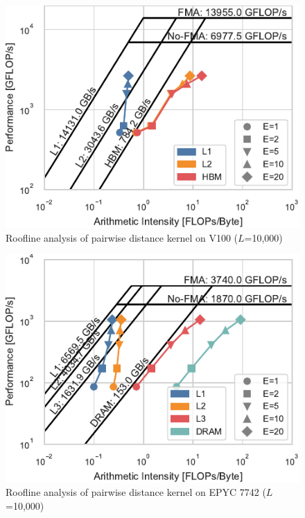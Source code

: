\documentclass[conference]{IEEEtran}
\begin{document}
\begin{figure}
    \centering
    \includegraphics{figs/roofline_distances_v100}
    \caption{Roofline analysis of pairwise distance kernel on V100 ($L$=10,000)}%
    \label{fig:roofline-distances-v100}
\end{figure}

\begin{figure}
    \centering
    \includegraphics{figs/roofline_distances_epyc}
    \caption{Roofline analysis of pairwise distance kernel on EPYC 7742 ($L$=10,000)}%
    \label{fig:roofline-distances-epyc}
\end{figure}
\end{document}
